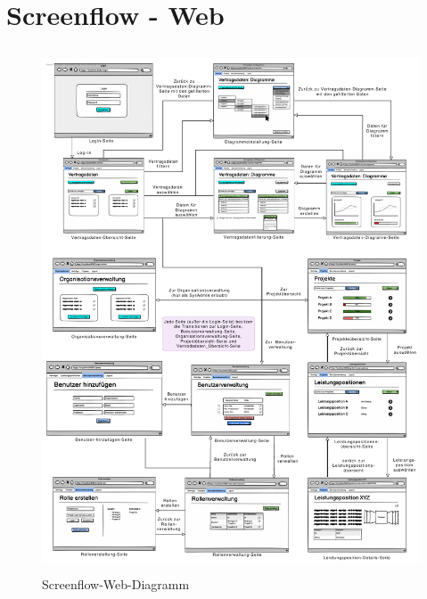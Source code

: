 \clearpage

\section{Screenflow - Web}

\begin{figure}[ht]
	\centering
	\includegraphics[width=16cm, height=15.5cm]{img/mockup_web/Screenflow_Web.pdf}
	\caption{Screenflow-Web-Diagramm}
\end{figure}

\clearpage
